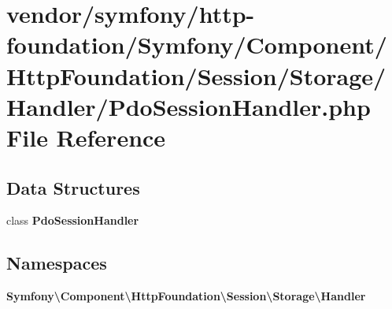 \section{vendor/symfony/http-\/foundation/\+Symfony/\+Component/\+Http\+Foundation/\+Session/\+Storage/\+Handler/\+Pdo\+Session\+Handler.php File Reference}
\label{_pdo_session_handler_8php}
\subsection*{Data Structures}
\begin{DoxyCompactItemize}
\item 
class {\bf Pdo\+Session\+Handler}
\end{DoxyCompactItemize}
\subsection*{Namespaces}
\begin{DoxyCompactItemize}
\item 
 {\bf Symfony\textbackslash{}\+Component\textbackslash{}\+Http\+Foundation\textbackslash{}\+Session\textbackslash{}\+Storage\textbackslash{}\+Handler}
\end{DoxyCompactItemize}
